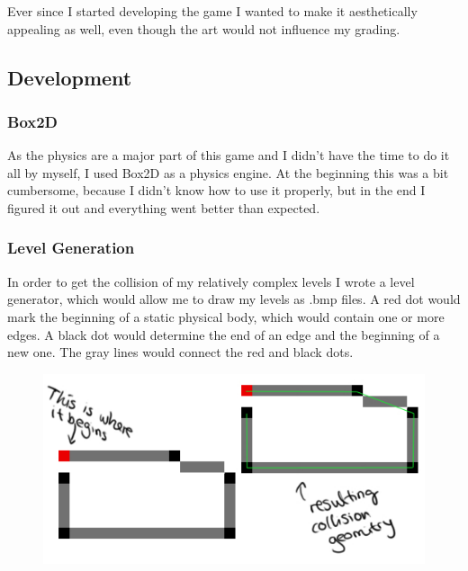 \documentclass[12pt,a4paper]{scrartcl}
\begin{document}
Ever since I started developing the game I wanted to make it aesthetically appealing as well, even though the art would not influence my grading.

\subsection*{Development}
\subsubsection*{Box2D}
As the physics are a major part of this game and I didn't have the time to do it all by myself, I used Box2D as a physics engine. At the beginning this was a bit cumbersome, because I didn't know how to use it properly, but in the end I figured it out and everything went better than expected. 

\subsubsection*{Level Generation}
In order to get the collision of my relatively complex levels I wrote a level generator, which would allow me to draw my levels as .bmp files. A red dot would mark the beginning of a static physical body, which would contain one or more edges. A black dot would determine the end of an edge and the beginning of a new one. The gray lines would connect the red and black dots. 

\begin{figure}[!h]
    \includegraphics[width=\textwidth]{collision.pdf}
\end{figure}
\end{document}
